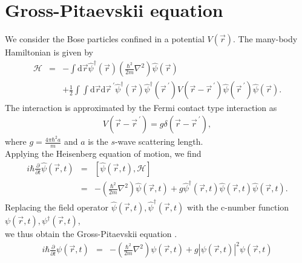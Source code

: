 \documentclass[12pt,a4paper]{jbook}
\newcommand{\diff}{\mathrm{d}}				           %
\begin{document}
\section{Gross-Pitaevskii equation}
We consider the Bose particles confined in a potential $V(\vec{r})$.
The many-body Hamiltonian is given by
\begin{eqnarray}
\mathcal{H} & = & - \int \diff \vec{r} \hat{\psi}^\dagger (\vec{r}) \left (\frac{\hbar^2}{2m} \nabla^2 \right)
\hat{\psi}(\vec{r}) \nonumber
\\
& & + \frac{1}{2} \int \int \diff \vec{r} \diff \vec{r}^{\ \prime} \hat{\psi}^\dagger( \vec{r} ) \hat{\psi}^\dagger( \vec{r}^{\ \prime} )
V (\vec{r} - \vec{r}^{\ \prime} ) \hat{\psi}( \vec{r}^{\ \prime} ) \hat{\psi}( \vec{r} ).
\end{eqnarray}
The interaction is approximated by the Fermi contact type interaction as
\begin{eqnarray}
V (\vec{r} - \vec{r}^{\ \prime} ) = g \delta (\vec{r} - \vec{r}^{\ \prime}),
\end{eqnarray}
where  $g = \frac{4 \pi \hbar^2 a}{m}$
and $a$ is the $s$-wave scattering length.
\\
Applying the Heisenberg equation of motion, we find
\begin{eqnarray}
i \hbar \frac{\partial}{\partial t} \hat{\psi} ( \vec{r}, t ) & = & \left[ \hat{\psi} ( \vec{r}, t ), \mathcal{H} \right] \nonumber
\\
& = & - \left( \frac{\hbar^2}{2m} \nabla^2 \right) \hat{\psi} ( \vec{r}, t )
+ g \hat{\psi}^\dagger (\vec{r}, t) \hat{\psi}( \vec{r}, t) \hat{\psi}( \vec{r}, t ).
\end{eqnarray}
Replacing the field operator $\hat{\psi}(\vec{r},t),\hat{\psi}^\dagger(\vec{r},t)$ with the c-number function
$\psi(\vec{r},t),\psi^\dagger(\vec{r},t)$,
\\
we thus obtain the Gross-Pitaevskii equation \cite{17}.
\begin{eqnarray}
i \hbar \frac{\partial}{\partial t} \psi ( \vec{r}, t ) & = &
- \left( \frac{\hbar^2}{2m} \nabla^2 \right) \psi( \vec{r}, t)
+ g | \psi(\vec{r}, t) |^2 \psi( \vec{r}, t )
\end{eqnarray}
\end{document}
